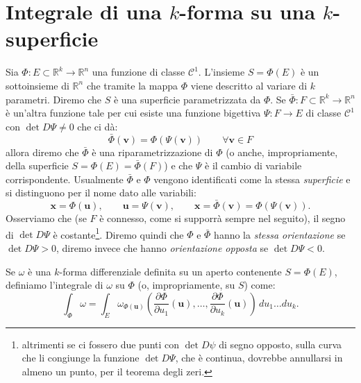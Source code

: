 \documentclass[italian,a4paper]{scrartcl}
\newcommand{\RR}{{\mathbb R}}
\newcommand{\defeq}{=}
\renewcommand{\vec}{\mathbf}
\begin{document}
\section{Integrale di una $k$-forma su una $k$-superficie}

Sia $\Phi\colon E\subset \RR^k\to \RR^n$ una funzione di classe
$\mathcal C^1$. L'insieme $S=\Phi(E)$ è un sottoinsieme di $\RR^n$ che
tramite la mappa $\Phi$ viene descritto al variare di $k$
parametri. Diremo che $S$ è una superficie parametrizzata da
$\Phi$. Se $\bar \Phi \colon F\subset \RR^k\to \RR^n$ è un'altra
funzione tale per cui esiste una funzione bigettiva $\Psi\colon F\to
E$ di classe $\mathcal C^1$ con $\det D\Psi \neq 0$
che ci dà:
\[
  \bar \Phi(\vec v) = \Phi(\Psi(\vec v)) \qquad \forall \vec v\in F
\]
allora diremo che $\bar \Phi$ è una riparametrizzazione di $\Phi$ (o
anche, impropriamente, della superficie $S=\Phi(E) = \bar\Phi(F)$) e
che $\Psi$ è il cambio di variabile corrispondente. Usualmente $\bar
\Phi$ e $\Phi$ vengono identificati come la stessa \emph{superficie} e
si distinguono per il nome dato alle variabili:
\[
  \vec x = \Phi(\vec u), \qquad \vec u = \Psi(\vec v), \qquad \vec x =
  \bar \Phi (\vec v) = \Phi(\Psi(\vec v)).
\]
Osserviamo che (se $F$ è connesso, come si supporrà sempre nel
seguito), il segno di $\det D\Psi$ è costante\footnote{altrimenti se ci
fossero due punti con $\det D\psi$ di segno opposto,
sulla curva che li congiunge la
funzione $\det D\Psi$, che è continua, dovrebbe annullarsi in almeno
un punto, per il teorema degli zeri.}. Diremo quindi che $\Phi$ e
$\bar \Phi$ hanno la \emph{stessa orientazione} se $\det D\Psi>0$,
diremo invece che hanno \emph{orientazione opposta} se $\det D\Psi<0$.

Se $\omega$ è una $k$-forma differenziale definita su un aperto contenente
$S=\Phi(E)$, definiamo l'integrale di $\omega$ su $\Phi$ (o,
impropriamente, su $S$) come:
\[
\int_\Phi \omega \defeq \int_E \omega_{\Phi(\vec u)}\left(\frac{\partial
  \Phi}{\partial u_1}(\vec u), \dots, \frac{\partial \Phi}{\partial
  u_k}(\vec u)\right)\, du_1 \dots du_k.
\]
\end{document}
